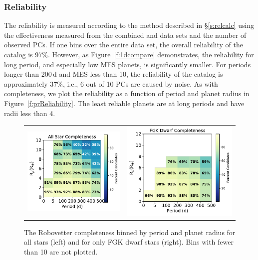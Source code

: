 \subsubsection{Reliability}
\label{s:reliability}
The reliability is measured according to the method described in \S\ref{s:relcalc} using the effectiveness measured from the combined \scrtce{} and \invtce{} data sets and the number of observed PCs.  If one bins over the entire data set, the overall reliability of the catalog is 97\%. However, as Figure~\ref{f:1dcompare} demonstrates, the reliability for long period, and especially low MES planets, is significantly smaller.  For periods longer than 200\,d and MES less than 10, the reliability of the catalog is approximately 37\%, i.e., 6 out of 10 PCs are caused by noise. As with completeness, we plot the reliability as a function of period and planet radius in Figure~\ref{f:prReliability}. The least reliable planets are at long periods and have radii less than 4\re. 


\begin{figure}[ht]
\begin{center}
\begin{tabular}{cc}
\includegraphics[width=0.5\linewidth]{f10-left.pdf} &
\includegraphics[width=0.5\linewidth]{f10-right.pdf}
\end{tabular}
\caption{The Robovetter completeness binned by period and planet radius for all stars (left) and for only FGK dwarf stars (right). Bins with fewer than 10  are not plotted.}
\label{f:prCompleteness}
\end{center}
\end{figure}


